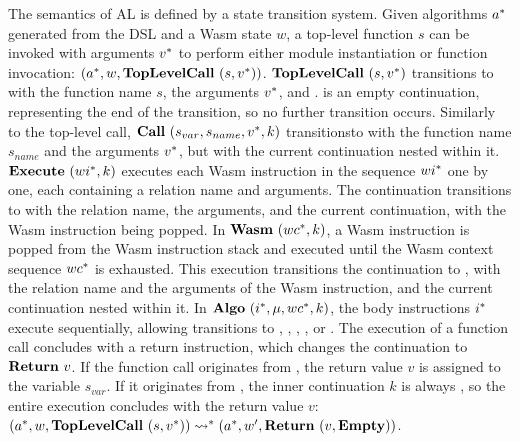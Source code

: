 The semantics of AL is defined by a state transition system.
Given algorithms $a^*$ generated from the DSL and a Wasm state $w$, a
top-level function $s$ can be invoked with arguments $v^*$ to perform
either module instantiation or function invocation:
$(a^*, w, \textbf{TopLevelCall} ~ (s, v^*))$.
$\textbf{TopLevelCall} ~ (s, v^*)${} transitions to \algo{} with the function name
$s$, the arguments $v^*$, and \mt{}.
\mt{} is an empty continuation, representing the end of the transition, so no
further transition occurs.
Similarly to the top-level call, $\textbf{Call}~ (s_{var}, s_{name}, v^*, k)${}
transitionsto \algo{} with the function name $s_{name}$ and the arguments $v^*$, but with the current continuation nested within it.
$\textbf{Execute} ~ (wi^*, k)${} executes each Wasm instruction in the sequence
$wi^*$ one by one, each containing a relation name and arguments.
The continuation transitions to \algo{} with the relation name, the arguments,
and the current continuation, with the Wasm instruction being popped.
In $\textbf{Wasm} ~ (wc^*, k)${}, a Wasm instruction is popped from
the Wasm instruction stack and executed until the Wasm context sequence
$wc^*$ is exhausted.
This execution transitions the continuation to \algo{}, with the relation name
and the arguments of the Wasm instruction, and the current continuation nested
within it.
In $\textbf{Algo} ~ (i^*, \mu, wc^*, k)${}, the body instructions $i^*$
execute sequentially, allowing transitions to \call{}, \exe{}, \wasm{}, \ret{},
or \algo{}.
The execution of a function call concludes with a return instruction, which
changes the continuation to $\textbf{Return} ~ v${}.
If the function call originates from \call{}, the return value $v$ is assigned
to the variable $s_{var}$.
If it originates from \toplevelcall{}, the inner continuation $k$ is always
\mt, so the entire execution concludes with the return value $v$:
$
(a^*, w, \textbf{TopLevelCall} ~ (s, v^*))
\leadsto^*
(a^*, w', \textbf{Return} ~ (v, \textbf{Empty}))
$.





